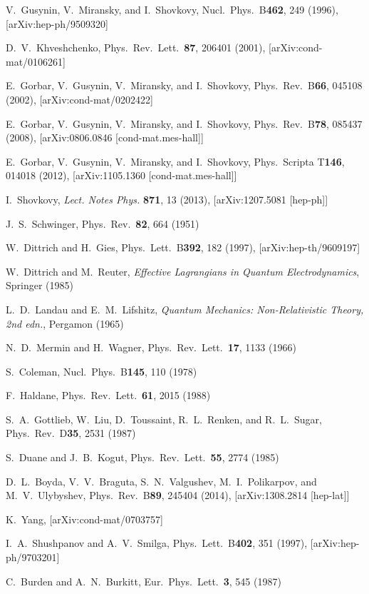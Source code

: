 \documentclass[aps,prd,twocolumn,showpacs,superscriptaddress,groupedaddress]{revtex4}  %
\begin{document}
\begin{thebibliography}{99}
V.~Gusynin, V.~Miransky, and I.~Shovkovy, Nucl.\ Phys.\ B{\bf 462}, 249 (1996), [arXiv:hep-ph/9509320]

D.~V.~Khveshchenko, Phys.\ Rev.\ Lett.\ {\bf 87}, 206401 (2001), [arXiv:cond-mat/0106261]

E.~Gorbar, V.~Gusynin, V.~Miransky, and I.~Shovkovy, Phys.\ Rev.\ B{\bf 66}, 045108 (2002), [arXiv:cond-mat/0202422]

E.~Gorbar, V.~Gusynin, V.~Miransky, and I.~Shovkovy, Phys.\ Rev.\ B{\bf 78}, 085437 (2008), [arXiv:0806.0846 [cond-mat.mes-hall]]

E.~Gorbar, V.~Gusynin, V.~Miransky, and I.~Shovkovy, Phys.\ Scripta T{\bf 146}, 014018 (2012), [arXiv:1105.1360 [cond-mat.mes-hall]]

I.~Shovkovy, {\it Lect. Notes Phys.} {\bf 871}, 13 (2013), [arXiv:1207.5081 [hep-ph]]

J.~S.~Schwinger, Phys.\ Rev.\ {\bf 82}, 664 (1951)

W.~Dittrich and H.~Gies, Phys.\ Lett.\ B{\bf 392}, 182 (1997), [arXiv:hep-th/9609197]

W.~Dittrich and M.~Reuter, {\it Effective Lagrangians in Quantum Electrodynamics}, Springer (1985)

L.~D.~Landau and E.~M.~Lifshitz, {\it Quantum Mechanics: Non-Relativistic Theory, 2nd edn.}, Pergamon (1965)

N.~D.~Mermin and H.~Wagner, Phys.\ Rev.\ Lett.\ {\bf 17}, 1133 (1966)

S.~Coleman, Nucl.\ Phys.\ B{\bf 145}, 110 (1978)

F.~Haldane, Phys.\ Rev.\ Lett.\ {\bf  61}, 2015 (1988)

S.~A.~Gottlieb, W.~Liu, D.~Toussaint, R.~L.~Renken, and R.~L.~Sugar, Phys.\ Rev.\ D{\bf 35}, 2531 (1987)

S.~Duane and J.~B.~Kogut, Phys.\ Rev.\ Lett.\ {\bf 55}, 2774 (1985)

D.~L.~Boyda, V.~V.~Braguta, S.~N.~Valgushev, M.~I.~Polikarpov, and M.~V.~Ulybyshev, Phys.\ Rev.\ B{\bf 89}, 245404 (2014), [arXiv:1308.2814 [hep-lat]]

K.~Yang, [arXiv:cond-mat/0703757]

I.~A.~Shushpanov and A.~V.~Smilga, Phys.\ Lett.\ B{\bf 402}, 351 (1997), [arXiv:hep-ph/9703201]



C.~Burden and A.~N.~Burkitt, Eur.\ Phys.\ Lett.\ {\bf 3}, 545 (1987)


\end{thebibliography}
\end{document}
